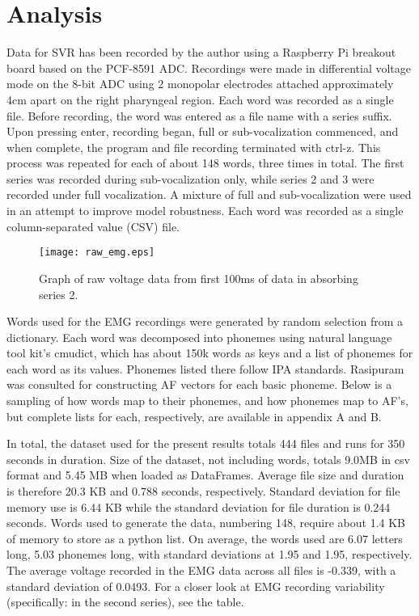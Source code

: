 \documentclass[conference]{IEEEtran}
\begin{document}
\section{Analysis}
Data for SVR has been recorded by the author using a Raspberry Pi breakout board based on the PCF-8591 ADC. \cite{repo} Recordings were made in differential voltage mode on the 8-bit ADC using 2 monopolar electrodes attached approximately 4cm apart on the right pharyngeal region. Each word was recorded as a single file. Before recording, the word was entered as a file name with a series suffix. Upon pressing enter, recording began, full or sub-vocalization commenced, and when complete, the program and file recording terminated with ctrl-z. This process was repeated for each of about 148 words, three times in total. The first series was recorded during sub-vocalization only, while series 2 and 3 were recorded under full vocalization. A mixture of full and sub-vocalization were used in an attempt to improve model robustness. Each word was recorded as a single column-separated value (CSV) file.

\begin{figure}[!t]
\centering
\texttt{[image: raw\_emg.eps]}
\caption{Graph of raw voltage data from first 100ms of data in absorbing series 2.}
\label{fig_raw_emg}
\end{figure}

Words used for the EMG recordings were generated by random selection from a dictionary. Each word was decomposed into phonemes using natural language tool kit's cmudict, which has about 150k words as keys and a list of phonemes for each word as its values. Phonemes listed there follow IPA standards. Rasipuram was consulted for constructing AF vectors for each basic phoneme. \cite{Rasipuram} Below is a sampling of how words map to their phonemes, and how phonemes map to AF's, but complete lists for each, respectively, are available in appendix A and B.

In total, the dataset used for the present results totals 444 files and runs for 350 seconds in duration. Size of the dataset, not including words, totals 9.0MB in csv format and 5.45 MB when loaded as DataFrames. Average file size and duration is therefore 20.3 KB and 0.788 seconds, respectively. Standard deviation for file memory use is 6.44 KB while the standard deviation for file duration is 0.244 seconds. Words used to generate the data, numbering 148, require about 1.4 KB of memory to store as a python list. On average, the words used are 6.07 letters long, 5.03 phonemes long, with standard deviations at 1.95 and 1.95, respectively. The average voltage recorded in the EMG data across all files is -0.339, with a standard deviation of 0.0493. For a closer look at EMG recording variability (specifically: in the second series), see the table.
\end{document}
